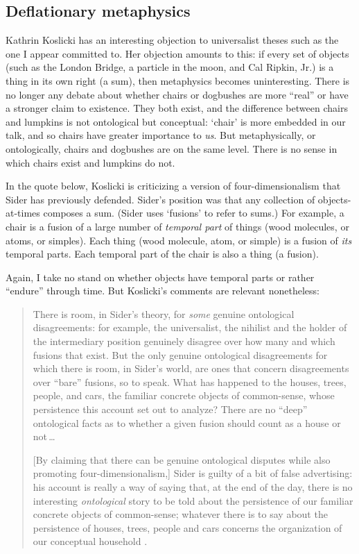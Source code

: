 \documentclass[12pt,twoside]{reedfancy}
\begin{document}
\begin{spacing}{1.25}
\subsection{Deflationary metaphysics}
\label{deflate}
Kathrin Koslicki has an interesting objection to universalist theses
such as the one I appear committed to.  Her objection amounts to this:
if every set of objects (such as the London Bridge, a particle in the
moon, and Cal Ripkin, Jr.) is a thing in its own right (a sum), then
metaphysics becomes uninteresting.  There is no longer any debate
about whether chairs or dogbushes are more ``real'' or have a stronger
claim to existence.  They both exist, and the difference between
chairs and lumpkins is not ontological but conceptual: `chair' is more
embedded in our talk, and so chairs have greater importance to {\em
  us}.  But metaphysically, or ontologically, chairs and dogbushes are
on the same level.  There is no sense in which chairs exist and
lumpkins do not.

In the quote below, Koslicki is criticizing a version of
four-dimensionalism that Sider has previously defended.  Sider's
position was that any collection of objects-at-times composes a sum.
(Sider uses `fusions' to refer to sums.)  For example, a chair is a
fusion of a large number of {\em temporal part} of things (wood
molecules, or atoms, or simples).  Each thing (wood molecule, atom, or
simple) is a fusion of {\em its} temporal parts.  Each temporal part
of the chair is also a thing (a fusion).

Again, I take no stand on whether objects have temporal parts or
rather ``endure'' through time.  But Koslicki's comments are relevant
nonetheless:

\begin{quote}
There is room, in Sider's theory, for {\em some} genuine ontological
disagreements: for example, the universalist, the nihilist and the
holder of the intermediary position genuinely disagree over how many
and which fusions that exist.  But the only genuine ontological
disagreements for which there is room, in Sider's world, are ones that
concern disagreements over ``bare'' fusions, so to speak.  What has
happened to the houses, trees, people, and cars, the familiar concrete
objects of common-sense, whose persistence this account set out to
analyze?  There are no ``deep'' ontological facts as to whether a
given fusion should count as a house or not\,\ldots

[By claiming that there can be genuine ontological disputes while also
  promoting four-dimensionalism,] Sider is guilty of a bit of false
advertising: his account is really a way of saying that, at the end of
the day, there is no interesting {\em ontological} story to be told
about the persistence of our familiar concrete objects of
common-sense; whatever there is to say about the persistence of
houses, trees, people and cars concerns the organization of our
conceptual household \citeyearpar[124--125]{koslicki2003}.
\end{quote}


\end{spacing}
\end{document}
